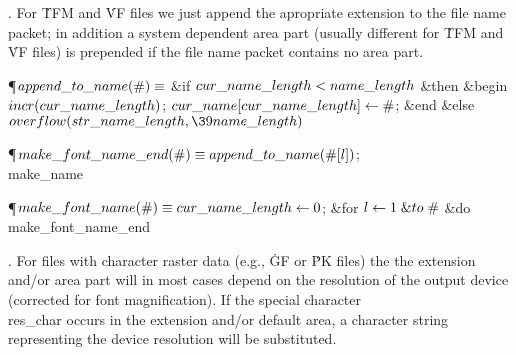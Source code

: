 . For \.{TFM} and \.{VF} files we just append the apropriate extension
to the file name packet; in addition a system dependent area part
(usually different for \.{TFM} and \.{VF} files) is prepended if
the file name packet contains no area part.

\Y\P\D {}$\\{append\_to\_name}(\#)\S$\1\6
\&{if} $\\{cur\_name\_length}<\\{name\_length}$ \1\&{then}\6
\&{begin} $\\{incr}(\\{cur\_name\_length})$;\5
$\\{cur\_name}[\\{cur\_name\_length}]\K\#$;\6
\&{end}\6
\4\&{else} $\\{overflow}(\\{str\_name\_length},\39\\{name\_length})$\2\2\par
\P\D {}$\\{make\_font\_name\_end}(\#)\S\\{append\_to\_name}(\#[\|l])$;\5
\\{make\_name}\par
\P\D {}$\\{make\_font\_name}(\#)\S\\{cur\_name\_length}\K0$;\6
\&{for} $\|l\K1\mathrel{\&{to}}\#$ \1\&{do}\5
\\{make\_font\_name\_end}\2\par
\fi

. For files with character raster data (e.g., \.{GF} or \.{PK} files) the
the extension and\slash or area part will in most cases depend on the
resolution of the output device (corrected for font magnification).
If the special character \\{res\_char} occurs in the extension and\slash or
default area, a character string representing the device resolution will
be substituted.

